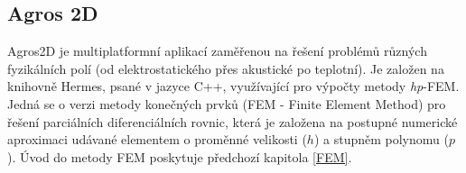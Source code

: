 \documentclass[12pt,a4paper,oneside]{article}
\numberwithin{equation}{section} %
\numberwithin{figure}{section} %
\numberwithin{table}{section} %
\begin{document}
%
%



\subsection{Agros 2D}
Agros2D je multiplatformní aplikací zaměřenou na řešení problémů různých fyzikálních polí (od elektrostatického přes akustické po teplotní). Je založen na knihovně Hermes, psané v jazyce C++, využívající pro výpočty metody \textit{hp}-FEM. Jedná se o verzi metody konečných prvků (FEM - Finite Element Method) pro řešení parciálních diferenciálních rovnic, která je založena na postupné numerické aproximaci udávané elementem o proměnné velikosti ($h$) a stupněm polynomu ($p$). Úvod do metody FEM poskytuje předchozí kapitola \ref{FEM}. \cite{hpFEM}
\end{document}
